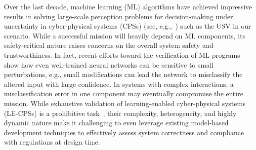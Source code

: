 Over the last decade, machine learning (ML) algorithms have achieved impressive results in solving large-scale  perception problems for decision-making under uncertainty in cyber-physical systems (CPSs) (see, e.g.,~\cite{Blum97,Jia14,Michalski13}) such as the USV in our scenario. 
While a successful mission will heavily depend on ML components, its safety-critical nature raises concerns on the overall system safety and trustworthiness. In fact, recent efforts toward the verification of ML programs~\cite{Szegedy2013} show how even well-trained neural networks can be sensitive to small perturbations, e.g., small modifications can lead the network to misclassify the altered input with large confidence. In systems with complex interactions, a misclassification error in one component may eventually compromise the entire mission.  
% 
While exhaustive validation of learning-enabled cyber-physical systems (LE-CPSs) is a prohibitive task~\cite{Kalra16},
their complexity, heterogeneity, and highly dynamic nature
make it challenging to even leverage existing model-based development techniques to effectively assess  system correctness 
and compliance with regulations at design time.
